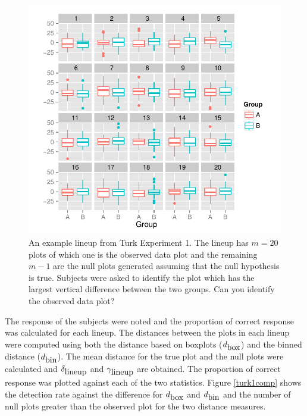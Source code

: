 \documentclass[12]{article}
\begin{document}
\begin{figure}[htbp]
\centering
\includegraphics[width=.95\textwidth]{turk1-example.pdf}
\caption{An example lineup from Turk Experiment 1. The lineup has $m = 20$ plots of which one is the observed data plot and the remaining $m - 1$ are the null plots generated assuming that the null hypothesis is true. Subjects were asked to identify the plot which has the largest vertical difference between the two groups. Can you identify the observed data plot?}
\label{turk1}
\end{figure}

The response of the subjects were noted and the proportion of correct response was calculated for each lineup. The distances between the plots in each lineup were computed using both the distance based on boxplots ($d_{\hbox{box}}$) and the binned distance ($d_{\hbox{bin}}$). The mean distance for the true plot and the null plots were calculated and $\delta_{\hbox{lineup}}$ and $\gamma_{\hbox{lineup}}$ are obtained. The proportion of correct response was plotted against each of the two statistics. Figure \ref{turk1comp} shows the detection rate against the difference for $d_{\hbox{box}}$ and $d_{\hbox{bin}}$ and the number of null plots greater than the observed plot for the two distance measures. 
\end{document}
